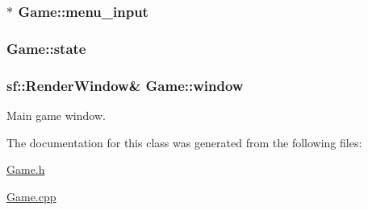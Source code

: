 \subsubsection[{menu\+\_\+input}]{$\ast$ Game\+::menu\+\_\+input\hspace{0.3cm}{\ttfamily [private]}}\label{class_game_af851bd0efbb65bb637f434f90bcdcae6}
\hypertarget{class_game_ad9fc2a8710ee56916f79314b91112ed0}{}
\subsubsection[{state}]{ Game\+::state\hspace{0.3cm}{\ttfamily [private]}}\label{class_game_ad9fc2a8710ee56916f79314b91112ed0}
\hypertarget{class_game_ad0fb4d8653dcf289fd6573cf5ba0f3d1}{}
\subsubsection[{window}]{\setlength{\rightskip}{0pt plus 5cm}sf\+::\+Render\+Window\& Game\+::window\hspace{0.3cm}{\ttfamily [private]}}\label{class_game_ad0fb4d8653dcf289fd6573cf5ba0f3d1}


Main game window. 



The documentation for this class was generated from the following files\+:\begin{DoxyCompactItemize}
\item 
\hyperlink{_game_8h}{Game.\+h}\item 
\hyperlink{_game_8cpp}{Game.\+cpp}\end{DoxyCompactItemize}
